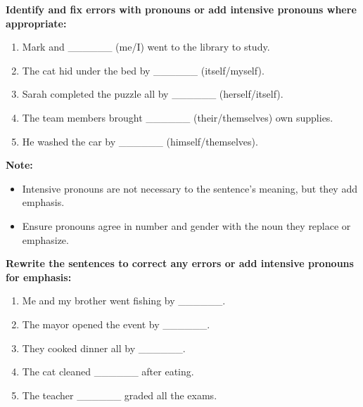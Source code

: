 \documentclass[12pt]{article}
\begin{document}
\begin{tcolorbox}[colframe=black!60, colback=white, 
coltitle=black, colbacktitle=black!15, fonttitle=\bfseries\Large, 
title=Guided Practice, halign title=center, left=10pt, right=10pt, top=10pt, bottom=15pt]
\textbf{Identify and fix errors with pronouns or add intensive pronouns where appropriate:}
\begin{enumerate}[itemsep=3em]
    \item Mark and \_\_\_\_\_\_ (me/I) went to the library to study.
    \item The cat hid under the bed by \_\_\_\_\_\_ (itself/myself).
    \item Sarah completed the puzzle all by \_\_\_\_\_\_ (herself/itself).
    \item The team members brought \_\_\_\_\_\_ (their/themselves) own supplies.
    \item He washed the car by \_\_\_\_\_\_ (himself/themselves).
\end{enumerate}
\end{tcolorbox}

\vspace{1em}

\begin{tcolorbox}[colframe=black!40, colback=gray!5, 
coltitle=black, colbacktitle=black!20, fonttitle=\bfseries\Large, 
title=Additional Notes, halign title=center, left=5pt, right=5pt, top=5pt, bottom=15pt]
\textbf{Note:}
\begin{itemize}
    \item Intensive pronouns are not necessary to the sentence's meaning, but they add emphasis.
    \item Ensure pronouns agree in number and gender with the noun they replace or emphasize.
\end{itemize}
\end{tcolorbox}

\vspace{1em}

\begin{tcolorbox}[colframe=black!60, colback=white, 
coltitle=black, colbacktitle=black!15, fonttitle=\bfseries\Large, 
title=Independent Practice, halign title=center, left=10pt, right=10pt, top=10pt, bottom=15pt]
\textbf{Rewrite the sentences to correct any errors or add intensive pronouns for emphasis:}
\begin{enumerate}[itemsep=3em]
    \item Me and my brother went fishing by  \_\_\_\_\_\_.
    \item The mayor opened the event by \_\_\_\_\_\_.
    \item They cooked dinner all by \_\_\_\_\_\_.
    \item The cat cleaned \_\_\_\_\_\_ after eating.
    \item The teacher \_\_\_\_\_\_ graded all the exams.
\end{enumerate}
\end{tcolorbox}
\end{document}
